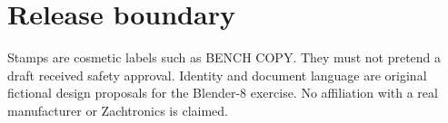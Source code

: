 \documentclass[10pt]{article}
\begin{document}
\section*{Release boundary}
Stamps are cosmetic labels such as BENCH COPY. They must not pretend a draft received safety approval.
\vfill
{\small\color{Muted}Identity and document language are original fictional design proposals for the Blender-8 exercise. No affiliation with a real manufacturer or Zachtronics is claimed.}
\end{document}

